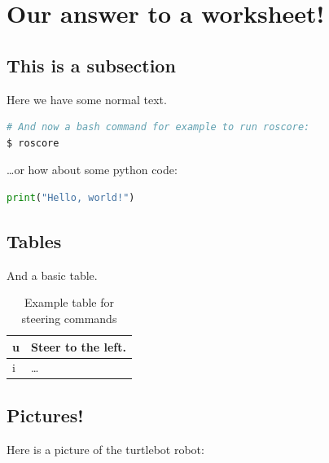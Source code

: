 \documentclass{rdl}
\begin{document}

\section{Our answer to a worksheet!}
\label{sec:bringup}

\subsection{This is a subsection}

Here we have some normal text.

\begin{lstlisting}[language=bash,basicstyle=\footnotesize]
# And now a bash command for example to run roscore:
$ roscore
\end{lstlisting}

\ldots or how about some python code:

\begin{lstlisting}[language=python,basicstyle=\footnotesize]
print("Hello, world!")
\end{lstlisting}

\subsection{Tables}

And a basic table.
\begin{table}[h!]
  \begin{tabular}{|l|l|}
   \hline
   u & Steer to the left. \\ \hline
   i & \ldots \\
   \hline
  \end{tabular}
  \caption{Example table for steering commands}
  \label{tab:steering}
\end{table}

\subsection{Pictures!}
Here is a picture of the turtlebot robot:
\end{document}

